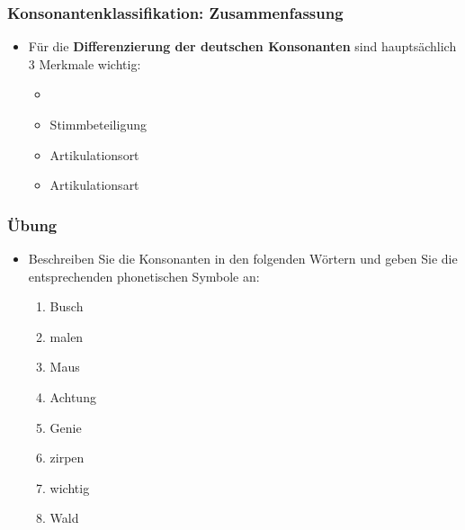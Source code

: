 \begin{frame}
\frametitle{Konsonantenklassifikation: Zusammenfassung}

	\begin{itemize}
		\item Für die \textbf{Differenzierung der deutschen Konsonanten} sind hauptsächlich 3 Merkmale wichtig:
		
		\begin{itemize}
			\item[]
			\item Stimmbeteiligung
			\item Artikulationsort
			\item Artikulationsart
		\end{itemize}
	\end{itemize}

\end{frame}


\begin{frame}

  \frametitle{Übung}

\begin{itemize}
	\item [] Beschreiben Sie die Konsonanten in den folgenden Wörtern und geben Sie die entsprechenden phonetischen Symbole an:

		 	\begin{enumerate}
		 		\item Busch
		 		\item malen
		 		\item Maus
		 		\item Achtung
		 		\item Genie
		 		\item zirpen
		 		\item wichtig
		 		\item Wald
		 	\end{enumerate}

\end{itemize}
\end{frame}


